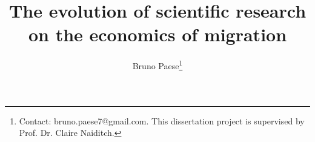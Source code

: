 \documentclass[a4paper, 10pt]{article}
\title{The evolution of scientific research on the economics of migration}
\author{Bruno Paese\thanks{Contact: bruno.paese7@gmail.com. This dissertation project is supervised by Prof. Dr. Claire Naiditch.}}
\date{}
\begin{document}
\renewcommand{\labelenumii}{\arabic{enumi}.\arabic{enumii}}

\maketitle















\newpage



\newpage


\end{document}
